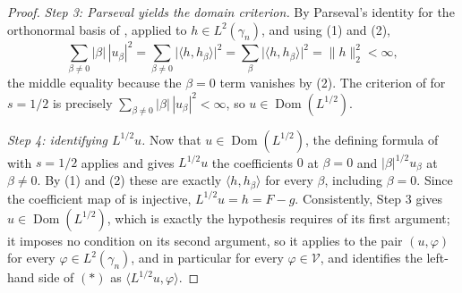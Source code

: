 \begin{proof}
\emph{Step 3: Parseval yields the domain criterion.}
By Parseval's identity for the orthonormal basis of ,
applied to $h \in L^2(\gamma_n)$, and using (1) and (2),
\[
  \sum_{\beta \neq 0} |\beta|\,|u_\beta|^2
    = \sum_{\beta \neq 0} \bigl|\langle h, h_\beta\rangle\bigr|^2
    = \sum_{\beta} \bigl|\langle h, h_\beta\rangle\bigr|^2
    = \|h\|_2^2 < \infty ,
\]
the middle equality because the $\beta = 0$ term vanishes by (2).  The criterion
of  for $s = 1/2$ is precisely
$\sum_{\beta\neq0}|\beta|\,|u_\beta|^2 < \infty$, so
$u \in \operatorname{Dom}(L^{1/2})$.

\emph{Step 4: identifying $L^{1/2}u$.}
Now that $u \in \operatorname{Dom}(L^{1/2})$, the defining formula of
 with $s = 1/2$ applies and gives $L^{1/2}u$ the coefficients
$0$ at $\beta = 0$ and $|\beta|^{1/2}u_\beta$ at $\beta \neq 0$.  By (1) and (2)
these are exactly $\langle h, h_\beta\rangle$ for every $\beta$, including
$\beta = 0$.  Since the coefficient map of  is injective,
$L^{1/2}u = h = F - g$.  Consistently, Step 3 gives
$u \in \operatorname{Dom}(L^{1/2})$, which is exactly the hypothesis
 requires of its first argument; it imposes no
condition on its second argument, so it applies to the pair $(u,\varphi)$ for
every $\varphi \in L^2(\gamma_n)$, and in particular for every
$\varphi \in \mathcal{V}$, and identifies the left-hand side of $(*)$ as
$\langle L^{1/2}u,\varphi\rangle$.
\end{proof}
